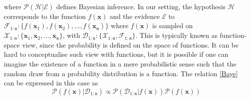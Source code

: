  where $\mathcal{P}(\mathcal{H}|\mathcal{E})$ defines Bayesian inference. In our setting, the hypothesis $\mathcal{H}$  corresponds to the function $f(\bm{x})$ and the evidence $\mathcal{E}$ to $\mathcal{F}_{1:{\mathfrak{n}}}:\{f(\bm{x}_1),f(\bm{x}_2),\hdots,f(\bm{x}_{\mathfrak{n}})\}$ where $f(\bm{x})$ is sampled on $\mathcal{X}_{1:{\mathfrak{n}}}:\{\bm{x}_1,\bm{x}_2,\hdots,\bm{x}_{\mathfrak{n}}\}$, with $\mathcal{D}_{1:{\mathfrak{n}}}:\{\mathcal{X}_{1:{\mathfrak{n}}},\mathcal{F}_{1:{\mathfrak{n}}}\}$. This is typically known as function-space view, since the probability is defined on the space of functions. It can be hard to conceptualise such view with functions, but it is possible if one can imagine the existence of a function in a mere probabilistic sense such that the random draw from a probability distribution is a function.  The relation \eqref{Baye} can be expressed in this case as\\
 
 \begin{equation}\label{Baye}
\mathcal{P}(f(\bm{x})|\mathcal{D}_{1:{\mathfrak{n}}}) \propto \mathcal{P}(\mathcal{D}_{1:{\mathfrak{n}}}|f(\bm{x}))\mathcal{P}(f(\bm{x}))
\end{equation}

 

 
